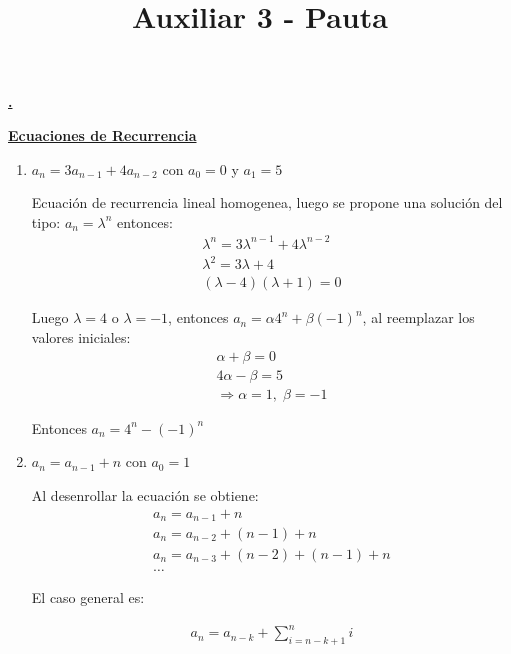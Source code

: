 \documentclass[dcc,uchile,sol]{fcfmcourse}
\title{Auxiliar 3 - Pauta}
\newcommand{\ptitle}[1]{\underline{\textbf{#1}}}
\begin{document}
\maketitle

\vspace{-1ex}


\begin{problems}
\problem \ptitle{.}

\problem \ptitle{Ecuaciones de Recurrencia}

\begin{enumerate}
    \item $a_n = 3a_{n-1} + 4a_{n-2}$ con $a_0 = 0$ y $a_1 = 5$ 
    
    Ecuación de recurrencia lineal homogenea, luego se propone una solución del tipo:  $a_n = \lambda^n$ entonces:
    \begin{align*}
    \lambda^n = 3\lambda^{n-1} + 4\lambda^{n-2} \\
    \lambda^2 = 3\lambda + 4 \\
    (\lambda - 4)(\lambda + 1) = 0
    \end{align*}
    
    Luego $\lambda = 4$ o $\lambda = -1$, entonces $a_n = \alpha 4^n + \beta (-1)^n$, al reemplazar los valores iniciales:
    \begin{align*}
    \alpha + \beta = 0 \\
    4\alpha - \beta = 5 \\
    \Rightarrow \alpha = 1,\; \beta = -1
    \end{align*}
    
    Entonces $a_n = 4^n - (-1)^n$\\
    
    
    \item $a_n = a_{n-1} + n$ con $a_0 = 1$
    
    Al desenrollar la ecuación se obtiene:
    \begin{align*}
    a_n = a_{n-1} + n \\
    a_n = a_{n-2} + (n-1) + n \\
    a_n = a_{n-3} + (n-2) + (n-1) + n \\
    \dots
    \end{align*}
    
    El caso general es:
    
    \begin{align*}
    a_n = a_{n-k} + \sum_{i = n-k+1}^{n} i 
    \end{align*}
    

\end{enumerate}
\end{problems}
\end{document}
